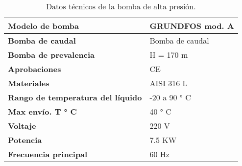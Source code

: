 \renewcommand{\arraystretch}{2}
\begin{table}[H]
    \centering
    \caption{Datos técnicos de la bomba de alta presión.}
    \label{table:bomba_alta_presion}
    \begin{tabular}{| L{5cm} | L{5cm} |}
        \hline
        \textbf{Modelo de bomba} & GRUNDFOS mod. A  \\
        \hline
        \textbf{Bomba de caudal} & Bomba de caudal  \\
        \hline
        \textbf{Bomba de prevalencia} & H = 170 m  \\
        \hline
        \textbf{Aprobaciones} & CE  \\
        \hline
        \textbf{Materiales} & AISI 316 L  \\
        \hline
        \textbf{Rango de temperatura del líquido} & -20 a 90 ° C  \\
        \hline
        \textbf{Max envío. T ° C} & 40 ° C  \\
        \hline
        \textbf{Voltaje} & 220 V  \\
        \hline
        \textbf{Potencia} & 7.5 KW  \\
        \hline
        \textbf{Frecuencia principal} & 60 Hz  \\
        \hline
   
    \end{tabular}
\end{table}
